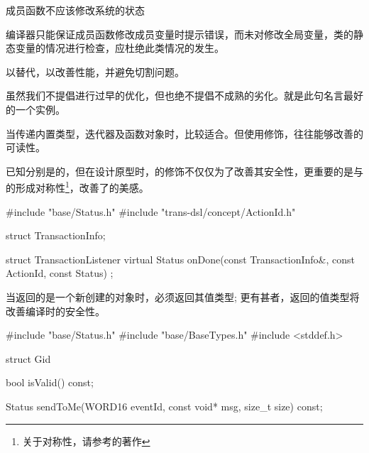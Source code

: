 \begin{content}
\begin{regulation}
成员函数不应该修改系统的状态
\end{regulation}

编译器只能保证成员函数修改成员变量时提示错误，而未对修改全局变量，类的静态变量的情况进行检查，应杜绝此类情况的发生。

\begin{regulation}
以替代，以改善性能，并避免切割问题。
\end{regulation}

虽然我们不提倡进行过早的优化，但也绝不提倡不成熟的劣化。就是此句名言最好的一个实例。

\begin{regulation}
当传递内置类型，迭代器及函数对象时，比较适合。但使用修饰，往往能够改善的可读性。
\end{regulation}

已知分别是的，但在设计原型时，的修饰不仅仅为了改善其安全性，更重要的是与的形成对称性\footnote{关于对称性，请参考的著作}，改善了的美感。

\begin{leftbar}
\begin{c++}
#include "base/Status.h"
#include "trans-dsl/concept/ActionId.h"

struct TransactionInfo;

struct TransactionListener
{
    virtual Status onDone(const TransactionInfo&, const ActionId, const Status) {}
};
\end{c++}
\end{leftbar}

\begin{regulation}
当返回的是一个新创建的对象时，必须返回其值类型; 更有甚者，返回的值类型将改善编译时的安全性。
\end{regulation}

\begin{leftbar}
\begin{c++}
#include "base/Status.h"
#include "base/BaseTypes.h"
#include <stddef.h>

struct Gid
{
    bool isValid() const;

    Status sendToMe(WORD16 eventId, const void* msg, size_t size) const;

}
\end{c++}
\end{leftbar}
\end{content}
